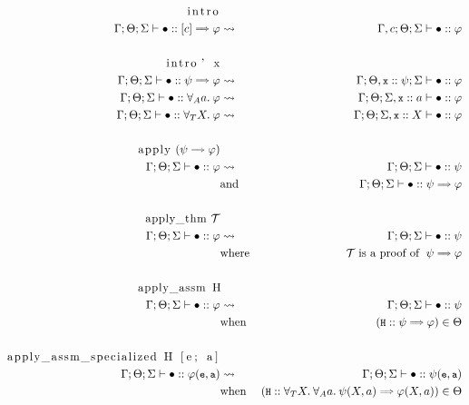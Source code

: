 \documentclass[english, mgr]{iithesis}
\renewcommand{\tt}[1]{\texttt{\small{#1}}}
\begin{document}
\begin{eqnarray*}
  \text{\lstinline[columns=fixed]{intro}} & & \\
    \jgmnt[\Gamma; \Theta; \Sigma]{\hole\ofkind{\fCImp{\constr}{\formphi}}} & \leadsto & \jgmnt[\Gamma, \constr; \Theta; \Sigma]{\hole\ofkind\formphi} \\
  & & \\
  \text{\lstinline[columns=fixed]{intro' x}} & & \\
  \jgmnt[\Gamma; \Theta; \Sigma]{\hole\ofkind{\psi\fImp\formphi}} & \leadsto & \jgmnt[\Gamma; \Theta, \tt{x} \ofkind\psi ; \Sigma]{\hole\ofkind\formphi} \\
  \jgmnt[\Gamma; \Theta; \Sigma]{\hole\ofkind{\fForallAtom{\atomv}{\formphi}}} & \leadsto & \jgmnt[\Gamma; \Theta; \Sigma, \tt{x} \ofkind\atomv]{\hole\ofkind\formphi} \\
  \jgmnt[\Gamma; \Theta; \Sigma]{\hole\ofkind{\fForallTerm{\termv}{\formphi}}} & \leadsto & \jgmnt[\Gamma; \Theta; \Sigma, \tt{x} \ofkind\termv]{\hole\ofkind\formphi} \\
  & & \\
  \text{\lstinline[columns=fixed]{apply} } (\psi \fImp \formphi)& & \\
  \jgmnt[\Gamma; \Theta; \Sigma]{\hole\ofkind{{\formphi}}} & \leadsto & \jgmnt[\Gamma; \Theta; \Sigma]{\hole\ofkind\psi} \\
  &   \text{and} & \jgmnt[\Gamma; \Theta; \Sigma]{\hole\ofkind\psi \fImp \formphi} \\
  & & \\
  \text{\lstinline[columns=fixed]{apply_thm} }  \mathcal{T} & & \\
    \jgmnt[\Gamma; \Theta; \Sigma]{\hole\ofkind{{\formphi}}} & \leadsto & \jgmnt[\Gamma; \Theta; \Sigma]{\hole\ofkind\psi} \\
   & \text{where} & \mathcal{T} \;\text{is a proof of }\; {\psi \fImp \formphi } \\
  & & \\
  \text{\lstinline[columns=fixed]{apply_assm H}} & & \\
    \jgmnt[\Gamma; \Theta; \Sigma]{\hole\ofkind{{\formphi}}} & \leadsto & \jgmnt[\Gamma; \Theta; \Sigma]{\hole\ofkind\psi} \\
   & \text{when} & (\tt{H} \ofkind {\psi\fImp\formphi }) \in \Theta \\
  & & \\
  \text{\lstinline[columns=fixed]{apply_assm_specialized H [e; a]}} & & \\
    \jgmnt[\Gamma; \Theta; \Sigma]{\hole\ofkind{{\formphi(\tt{e}, \tt{a})}}} & \leadsto & \jgmnt[\Gamma; \Theta; \Sigma]{\hole\ofkind\psi(\tt{e}, \tt{a})} \\
   & \text{when} & (\tt{H} \ofkind {\kForallTerm{X}\kForallAtom{a} \psi(X, a)\fImp\formphi(X, a) }) \in \Theta
  \end{eqnarray*}
\end{document}
